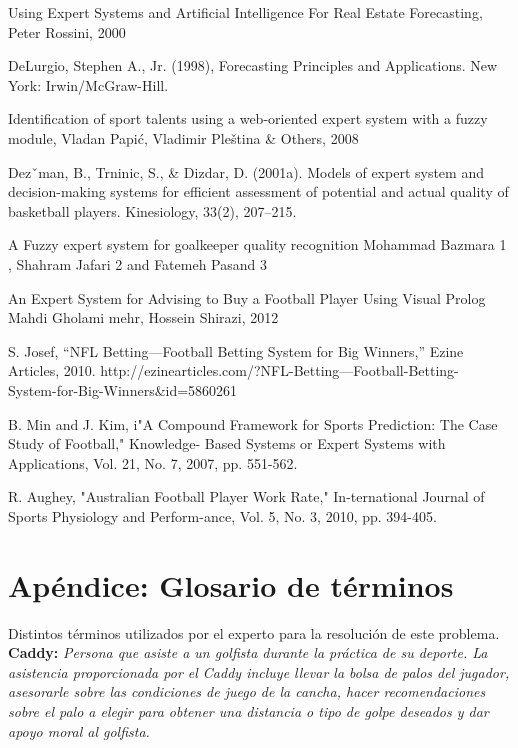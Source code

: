 \documentclass[runningheads,a4paper]{llncs}
\begin{document}
\begin{thebibliography}{7}

   Using Expert Systems and Artificial Intelligence For Real
    Estate Forecasting, Peter Rossini, 2000

   DeLurgio, Stephen A., Jr. (1998), Forecasting Principles and
    Applications. New York: Irwin/McGraw-Hill. 

   Identification of  sport talents using a web-oriented
    expert  system  with  a fuzzy module, Vladan  Papić, Vladimir Pleština \&
    Others, 2008

   Dezˇman, B., Trninic, S., \& Dizdar, D. (2001a). Models
    of expert system and decision-making systems for efficient assessment of
    potential and actual quality of basketball players. Kinesiology, 33(2),
    207–215.

   A Fuzzy expert system for goalkeeper quality recognition
    Mohammad Bazmara 1 , Shahram Jafari 2 and Fatemeh Pasand 3

   An Expert System for Advising to Buy a Football
  Player Using Visual Prolog
  Mahdi Gholami mehr, Hossein Shirazi, 2012

   S. Josef, “NFL Betting—Football Betting System for Big
    Winners,” Ezine Articles, 2010.
    http://ezinearticles.com/?NFL-Betting---Football-Betting-
    System-for-Big-Winners\&id=5860261

   B. Min and J. Kim, i"A Compound Framework for Sports
    Prediction: The Case Study of Football," Knowledge-
    Based Systems or Expert Systems with Applications, Vol.
    21, No. 7, 2007, pp. 551-562.

   R. Aughey, "Australian Football Player Work Rate,"
    In-ternational Journal of Sports Physiology and Perform-ance, Vol. 5, No.
    3, 2010, pp. 394-405.

\end{thebibliography}

\appendix

\section{Apéndice: Glosario de términos}

  Distintos términos utilizados por el experto para la resolución de este
  problema.\\

  \textbf{Caddy:} \textit{Persona que asiste a un golfista durante la práctica de
  su deporte. La asistencia proporcionada por el Caddy incluye llevar la bolsa de
  palos del jugador, asesorarle sobre las condiciones de juego de la cancha,
  hacer recomendaciones sobre el palo a elegir para obtener una distancia o tipo
  de golpe deseados y dar apoyo moral al golfista.}\\
  
\end{document}
